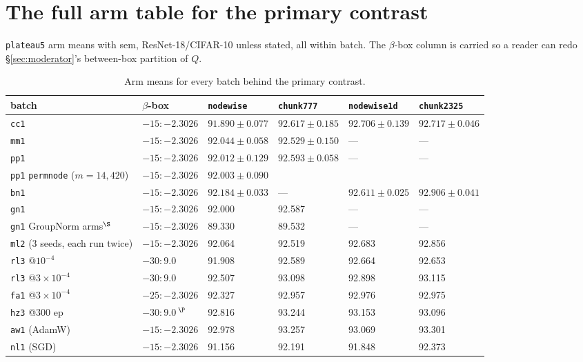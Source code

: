\documentclass[10pt,letterpaper]{article}
\newcommand{\plateau}{\texttt{plateau5}}
\newcommand{\arm}[1]{\texttt{#1}}
\begin{document}
\section{The full arm table for the primary contrast}
\label{app:arms}

\plateau{} arm means with sem, ResNet-18/CIFAR-10 unless stated, all within batch. The
$\beta$-box column is carried so a reader can redo \S\ref{sec:moderator}'s between-box partition of
$Q$.

\begin{table}[htbp]
\centering
\scriptsize
\setlength{\tabcolsep}{3pt}
\caption{Arm means for every batch behind the primary contrast.}
\label{tab:arms}
\begin{tabular}{@{}llllll@{}}
\toprule
batch & $\beta$-box & \arm{nodewise} & \arm{chunk777} & \arm{nodewise1d} & \arm{chunk2325} \\
\midrule
\arm{cc1} & $-15{:}{-}2.3026$ & $91.890 \pm 0.077$ & $92.617 \pm 0.185$ & $92.706 \pm 0.139$ &
  $92.717 \pm 0.046$ \\
\arm{mm1} & $-15{:}{-}2.3026$ & $92.044 \pm 0.058$ & $92.529 \pm 0.150$ & --- & --- \\
\arm{pp1} & $-15{:}{-}2.3026$ & $92.012 \pm 0.129$ & $92.593 \pm 0.058$ & --- & --- \\
\arm{pp1} \arm{permnode} ($m = 14{,}420$) & $-15{:}{-}2.3026$ & $92.003 \pm 0.090$ & & & \\
\arm{bn1} & $-15{:}{-}2.3026$ & $92.184 \pm 0.033$ & --- & $92.611 \pm 0.025$ &
  $92.906 \pm 0.041$ \\
\arm{gn1} & $-15{:}{-}2.3026$ & 92.000 & 92.587 & --- & --- \\
\arm{gn1} GroupNorm arms$^{\S}$ & $-15{:}{-}2.3026$ & 89.330 & 89.532 & --- & --- \\
\arm{ml2} (3 seeds, each run twice) & $-15{:}{-}2.3026$ & 92.064 & 92.519 & 92.683 & 92.856 \\
\arm{rl3} @$10^{-4}$ & $-30{:}9.0$ & 91.908 & 92.589 & 92.664 & 92.653 \\
\arm{rl3} @$3{\times}10^{-4}$ & $-30{:}9.0$ & 92.507 & 93.098 & 92.898 & 93.115 \\
\arm{fa1} @$3{\times}10^{-4}$ & $-25{:}{-}2.3026$ & 92.327 & 92.957 & 92.976 & 92.975 \\
\arm{hz3} @300 ep & $-30{:}9.0$\,$^{\P}$ & 92.816 & 93.244 & 93.153 & 93.096 \\
\arm{aw1} (AdamW) & $-15{:}{-}2.3026$ & 92.978 & 93.257 & 93.069 & 93.301 \\
\arm{nl1} (SGD) & $-15{:}{-}2.3026$ & 91.156 & 92.191 & 91.848 & 92.373 \\

\end{tabular}
\end{table}
\end{document}
